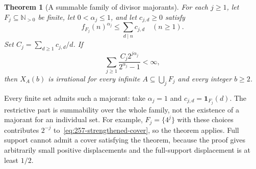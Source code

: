 \documentclass[11pt]{article}
\theoremstyle{plain}
\newtheorem{thm}{Theorem}[section]
\theoremstyle{definition}
\theoremstyle{remark}
\newcommand{\Npos}{\mathbb{N}_{>0}}
\begin{document}
\begin{thm}[A summable family of divisor majorants]\label{thm:257-variable-fractional-cover}
For each $j\ge1$, let $F_j\subseteq\Npos$ be finite, let
$0<\alpha_j\le1$, and let $c_{j,d}\ge0$ satisfy
\[
 f_{F_j}(n)^{\alpha_j}\le\sum_{d\mid n}c_{j,d}\quad(n\ge1).
\]
Set $C_j=\sum_{d\ge1}c_{j,d}/d$.  If
\begin{equation}
 \sum_{j\ge1}\frac{C_j2^{j\alpha_j}}{2^{\alpha_j}-1}<\infty,
 \label{eq:257-strengthened-cover}
\end{equation}
then $X_A(b)$ is irrational for every infinite
$A\subseteq\bigcup_jF_j$ and every integer $b\ge2$.
\end{thm}

Every finite set admits such a majorant: take $\alpha_j=1$ and
$c_{j,d}=\mathbf1_{F_j}(d)$.  The restrictive part is summability over the
whole family, not the existence of a majorant for an individual set.
For example, $F_j=\{4^j\}$ with these choices contributes $2^{-j}$
to~\eqref{eq:257-strengthened-cover}, so the theorem applies.  Full support
cannot admit a cover satisfying the theorem, because the proof gives
arbitrarily small positive displacements and the full-support displacement
is at least $1/2$.
\end{document}
